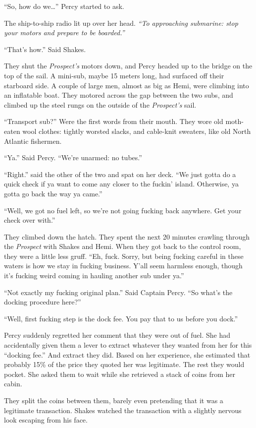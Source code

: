 \documentclass[
]{scrbook}
\begin{document}
``So, how do we\ldots{}'' Percy started to ask.

The ship-to-ship radio lit up over her head. \emph{``To approaching
submarine: stop your motors and prepare to be boarded.''}

``That's how.'' Said Shakes.

They shut the \emph{Prospect's} motors down, and Percy headed up to the
bridge on the top of the sail. A mini-sub, maybe 15 meters long, had
surfaced off their starboard side. A couple of large men, almost as big
as Hemi, were climbing into an inflatable boat. They motored across the
gap between the two subs, and climbed up the steel rungs on the outside
of the \emph{Prospect's} sail.

``Transport sub?'' Were the first words from their mouth. They wore old
moth-eaten wool clothes: tightly worsted slacks, and cable-knit
sweaters, like old North Atlantic fishermen.

``Ya.'' Said Percy. ``We're unarmed: no tubes.''

``Right.'' said the other of the two and spat on her deck. ``We just
gotta do a quick check if ya want to come any closer to the fuckin'
island. Otherwise, ya gotta go back the way ya came.''

``Well, we got no fuel left, so we're not going fucking back anywhere.
Get your check over with.''

They climbed down the hatch. They spent the next 20 minutes crawling
through the \emph{Prospect} with Shakes and Hemi. When they got back to
the control room, they were a little less gruff. ``Eh, fuck. Sorry, but
being fucking careful in these waters is how we stay in fucking
business. Y'all seem harmless enough, though it's fucking weird coming
in hauling another sub under ya.''

``Not exactly my fucking original plan.'' Said Captain Percy. ``So
what's the docking procedure here?''

``Well, first fucking step is the dock fee. You pay that to us before
you dock.''

Percy suddenly regretted her comment that they were out of fuel. She had
accidentally given them a lever to extract whatever they wanted from her
for this ``docking fee.'' And extract they did. Based on her experience,
she estimated that probably 15\% of the price they quoted her was
legitimate. The rest they would pocket. She asked them to wait while she
retrieved a stack of coins from her cabin.

They split the coins between them, barely even pretending that it was a
legitimate transaction. Shakes watched the transaction with a slightly
nervous look escaping from his face.
\end{document}
